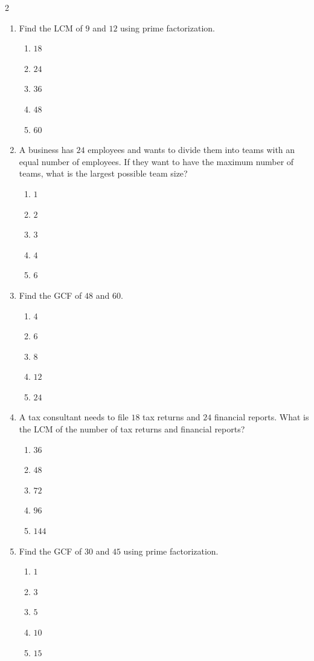 \documentclass[10pt]{article}
\begin{document}
\begin{multicols}{2}
\begin{enumerate}[label=\textbf{Q\arabic*.}, leftmargin=*, itemsep=6pt, parsep=0pt]
  \item \small Find the LCM of $9$ and $12$ using prime factorization.
  \begin{enumerate}[label=(\Alph*), leftmargin=0.6cm, nosep, itemsep=2pt]
    \item $18$
    \item $24$
    \item $36$
    \item $48$
    \item $60$
  \end{enumerate}

  \item \small A business has $24$ employees and wants to divide them into teams with an equal number of employees. If they want to have the maximum number of teams, what is the largest possible team size?
  \begin{enumerate}[label=(\Alph*), leftmargin=0.6cm, nosep, itemsep=2pt]
    \item $1$
    \item $2$
    \item $3$
    \item $4$
    \item $6$
  \end{enumerate}

  \item \small Find the GCF of $48$ and $60$.
  \begin{enumerate}[label=(\Alph*), leftmargin=0.6cm, nosep, itemsep=2pt]
    \item $4$
    \item $6$
    \item $8$
    \item $12$
    \item $24$
  \end{enumerate}

  \item \small A tax consultant needs to file $18$ tax returns and $24$ financial reports. What is the LCM of the number of tax returns and financial reports?
  \begin{enumerate}[label=(\Alph*), leftmargin=0.6cm, nosep, itemsep=2pt]
    \item $36$
    \item $48$
    \item $72$
    \item $96$
    \item $144$
  \end{enumerate}

  \item \small Find the GCF of $30$ and $45$ using prime factorization.
  \begin{enumerate}[label=(\Alph*), leftmargin=0.6cm, nosep, itemsep=2pt]
    \item $1$
    \item $3$
    \item $5$
    \item $10$
    \item $15$
  \end{enumerate}


\end{enumerate}
\end{multicols}
\end{document}
